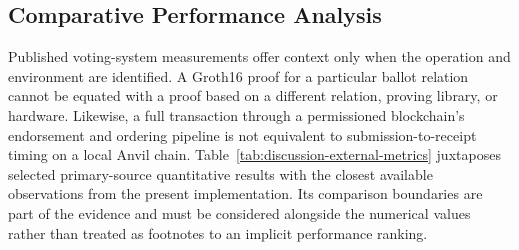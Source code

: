 \subsection{Comparative Performance Analysis}
\label{subsec:discussion-literature-comparison}
\label{sec:08}
\label{sec:discussion-comparison}

Published voting-system measurements offer context only when the operation and environment are identified. A Groth16 proof for a particular ballot relation cannot be equated with a proof based on a different relation, proving library, or hardware. Likewise, a full transaction through a permissioned blockchain's endorsement and ordering pipeline is not equivalent to submission-to-receipt timing on a local Anvil chain. Table~\ref{tab:discussion-external-metrics} juxtaposes selected primary-source quantitative results with the closest available observations from the present implementation. Its comparison boundaries are part of the evidence and must be considered alongside the numerical values rather than treated as footnotes to an implicit performance ranking.

